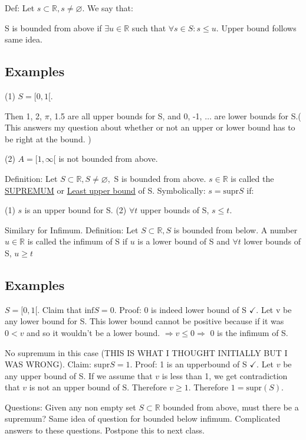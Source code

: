\documentclass{article}
\begin{document}
Def: Let $s \subset \mathbb{R}, s \neq \varnothing$. We say that:

S is bounded from above if $\exists u \in \mathbb{R}$ such that $\forall s \in S: s \leq u$. Upper bound follows same idea.

\subsection{Examples}

(1) $S = [0, 1[$.

Then 1, 2, $\pi$, 1.5 are all upper bounds for S, and 0, -1, $\dots$ are lower bounds for S.( This answers my question about whether or not an upper or lower bound has to be right at the bound. )

(2) $A = [1, \infty[$ is not bounded from above. 

Definition: Let $S \subset \mathbb{R}, S \neq \varnothing,$ S is bounded from above. $s \in \mathbb{R}$ is called the \underline{SUPREMUM} or \underline{Least upper bound} of S. Symbolically: $s = \text{supr}S$ if:

(1) $s$ is an upper bound for S.
(2) $\forall t$ upper bounds of S, $s \leq t$.

Similary for Infimum. Definition: Let $S \subset \mathbb{R}, S$ is bounded from below. A number $u \in \mathbb{R}$ is called the infimum of S if $u$ is a lower bound of S and $\forall t$ lower bounds of S, $u \geq t$

\subsection{Examples}

$S = [0, 1[$. Claim that $\text{inf}S = 0$. Proof: 0 is indeed lower bound of S $\checkmark$. Let v be any lower bound for S. This lower bound cannot be positive because if it was $0 < v$ and so it wouldn't be  a lower bound. $\Rightarrow v \leq 0 \Rightarrow$ 0 is the infimum of S.

No supremum in this case (THIS IS WHAT I THOUGHT INITIALLY BUT I WAS WRONG). Claim: supr$S = 1$. Proof: 1 is an upperbound of S  $\checkmark$. Let $v$ be any upper bound of S. If we assume that $v$ is less than 1, we get contradiction that $v$ is not an upper bound of S. Therefore $v \geq 1$. Therefore $1 = \text{supr}(S)$.

Questions: Given any non empty set $S \subset \mathbb{R}$ bounded from above, must there be a supremum? Same idea of question for bounded below infimum. Complicated answers to these questions. Postpone this to next class.
\end{document}
